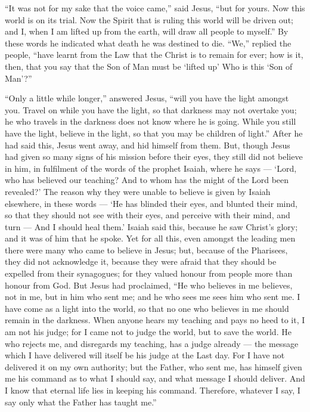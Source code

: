  ``It was not for my sake that the voice came,'' said
Jesus, ``but for yours.  Now this world is on its trial.
Now the Spirit that is ruling this world will be driven out;
 and I, when I am lifted up from the earth, will draw all
people to myself.''  By these words he indicated what death
he was destined to die.  ``We,'' replied the people, ``have
learnt from the Law that the Christ is to remain for ever; how is it,
then, that you say that the Son of Man must be `lifted up' Who is this
`Son of Man'?''

 ``Only a little while longer,'' answered Jesus, ``will you
have the light amongst you. Travel on while you have the light, so that
darkness may not overtake you; he who travels in the darkness does not
know where he is going.  While you still have the light,
believe in the light, so that you may be children of light.'' After he
had said this, Jesus went away, and hid himself from them. 
But, though Jesus had given so many signs of his mission before their
eyes, they still did not believe in him,  in fulfilment of
the words of the prophet Isaiah, where he says --- `Lord, who has
believed our teaching? And to whom has the might of the Lord been
revealed?'  The reason why they were unable to believe is
given by Isaiah elsewhere, in these words ---  `He has
blinded their eyes, and blunted their mind, so that they should not see
with their eyes, and perceive with their mind, and turn --- And I should
heal them.'  Isaiah said this, because he saw Christ's
glory; and it was of him that he spoke.  Yet for all this,
even amongst the leading men there were many who came to believe in
Jesus; but, because of the Pharisees, they did not acknowledge it,
because they were afraid that they should be expelled from their
synagogues;  for they valued honour from people more than
honour from God.  But Jesus had proclaimed, ``He who
believes in me believes, not in me, but in him who sent me;
 and he who sees me sees him who sent me.  I
have come as a light into the world, so that no one who believes in me
should remain in the darkness.  When anyone hears my
teaching and pays no heed to it, I am not his judge; for I came not to
judge the world, but to save the world.  He who rejects me,
and disregards my teaching, has a judge already --- the message which I
have delivered will itself be his judge at the Last day. 
For I have not delivered it on my own authority; but the Father, who
sent me, has himself given me his command as to what I should say, and
what message I should deliver.  And I know that eternal
life lies in keeping his command. Therefore, whatever I say, I say only
what the Father has taught me.''

